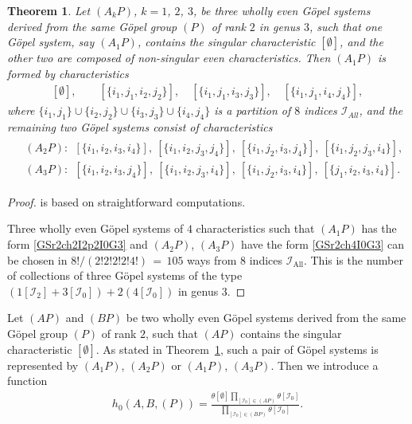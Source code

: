 \documentclass[twoside]{amsart}
\newcommand{\I}{\mathcal{I}}
\newtheorem{theo}{Theorem}[section]
\theoremstyle{definition}
\theoremstyle{plain}
\begin{document}
\begin{theo}\label{T:GSr2StructG3}
Let $(A_k P)$, $k=1$, $2$, $3$, be three wholly even G\"{o}pel systems 
derived from the same G\"{o}pel group $(P)$ of rank $2$ in genus $3$,
such that one G\"{o}pel system, say $(A_1 P)$, contains the singular characteristic $[\emptyset]$, 
and the other two are composed of non-singular even characteristics. 
Then $(A_1 P)$ is formed by characteristics
\begin{gather}\label{GSr2ch2I2p2I0G3}
[\emptyset],  \qquad  [\{i_1,j_1,i_2,j_2\}],\quad
[\{i_1,j_1,i_3,j_3\}],\quad [\{i_1,j_1,i_4,j_4\}],
\end{gather}
where $\{i_1,j_1\} \cup\{i_2,j_2\}\cup\{i_3,j_3\}\cup \{i_4,j_4\}$ is a partition of 
$8$ indices $\I_{All}$, and 
the remaining two G\"{o}pel systems consist of characteristics
\begin{gather}\label{GSr2ch4I0G3}
\begin{split}
&(A_2 P):\ \  [\{i_1,i_2,i_3,i_4\}],\ [\{i_1,i_2,j_3,j_4\}],\ 
[\{i_1,j_2,i_3,j_4\}],\ [\{i_1,j_2,j_3,i_4\}], \\
&(A_3 P):\ \  [\{i_1,i_2,i_3,j_4\}],\  [\{i_1,i_2,j_3,i_4\}],\ 
[\{i_1,j_2,i_3,i_4\}],\  [\{j_1,i_2,i_3,i_4\}].
\end{split}
\end{gather}
\end{theo}
\begin{proof} is based on straightforward computations.

Three wholly even G\"{o}pel systems of $4$ characteristics
such that $(A_1 P)$ has the form \eqref{GSr2ch2I2p2I0G3} and
$(A_2 P)$, $(A_3 P)$ have the form \eqref{GSr2ch4I0G3} can be chosen
in $8!/(2!2!2!2!4!)\,{=}\,105$ ways from 8 indices $\I_{\text{All}}$. This is the number of 
collections of three G\"{o}pel systems  of the type $(1[\I_2]+3[\I_0])+2(4[\I_0])$ in genus $3$.
 \end{proof}
 
 Let $(AP)$ and $(BP)$ be two wholly even G\"{o}pel systems 
derived from the same G\"{o}pel group $(P)$ of rank $2$, such that 
$(AP)$ contains the singular characteristic $[\emptyset]$. 
As stated in Theorem~\ref{T:GSr2StructG3}, such a pair of G\"{o}pel systems 
is represented by $(A_1P)$, $(A_2 P)$ or $(A_1P)$, $(A_3 P)$.
Then we introduce a function
\begin{gather}\label{h0G3}
h_0(A,B,(P)) = \frac{ \theta[\emptyset]  \prod_{[\I_0] \in (A P)} \theta[\I_0]}
{\prod_{[\I_0] \in (B P)} \theta[\I_0]}.
\end{gather}
\end{document}
